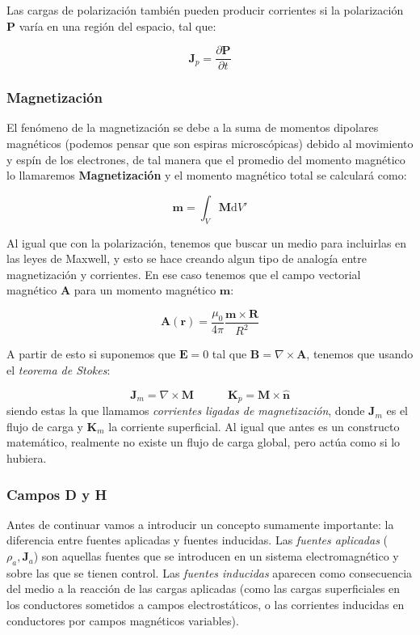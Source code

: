 \documentclass[12pt,a4paper]{article}
\newcommand{\parciales}[2]{\frac{\partial #1}{\partial #2}}
\newcommand{\D}{\mathrm{d}}
\newcommand{\tquad}{\quad \quad \quad}
\newcommand{\rota}{\nabla \times}
\newcommand{\Bn}{\mathbf{B}}
\newcommand{\En}{\mathbf{E}}
\newcommand{\Jn}{\mathbf{J}}
\newcommand{\Kn}{\mathbf{K}}
\newcommand{\rn}{\mathbf{r}}
\newcommand{\An}{\mathbf{A}}
\newcommand{\Pn}{\mathbf{P}}
\newcommand{\mn}{\mathbf{m}}
\newcommand{\Mn}{\mathbf{M}}
\newcommand{\Rn}{\mathbf{R}}
\newcommand{\hnn}{\hat{\mathbf{n}}}
\numberwithin{equation}{section}
\numberwithin{figure}{section}
\begin{document}
Las cargas de polarización también pueden producir corrientes si la polarización $\Pn$ varía en una región del espacio, tal que:

\begin{equation}
\Jn_p = \parciales{\Pn}{t}
\end{equation}


\subsubsection{Magnetización}

El fenómeno de la magnetización se debe a la suma de momentos dipolares magnéticos (podemos pensar que son espiras microscópicas) debido al movimiento y espín de los electrones, de tal manera que el promedio del momento magnético lo llamaremos \textbf{Magnetización} y el momento magnético total se calculará como:

\begin{equation}
\mn = \int_V \Mn \D V' 
\end{equation}

Al igual que con la polarización, tenemos que buscar un medio para incluirlas en las leyes de Maxwell, y esto se hace creando algun tipo de analogía entre magnetización y corrientes. En ese caso tenemos que el campo vectorial magnético $\An$ para un momento magnético $\mn$:

\begin{equation}
\An (\rn) = \dfrac{\mu_0}{4 \pi} \dfrac{\mn \times \Rn}{R^2}
\end{equation}

A partir de esto si suponemos que $\En=0$ tal que $\Bn = \rota \An$, tenemos que usando el \textit{teorema de Stokes}:

\begin{equation}
\Jn_m = \rota \Mn \tquad \Kn_p = \Mn \times \hnn
\end{equation}
siendo estas la que llamamos \textit{corrientes ligadas de magnetización}, donde $\Jn_m$ es el flujo de carga y $\Kn_m$ la corriente superficial. Al igual que antes es un constructo matemático, realmente no existe un flujo de carga global, pero actúa como si lo hubiera. 

\subsubsection{Campos D y H}

Antes de continuar vamos a introducir un concepto sumamente importante: la diferencia entre fuentes aplicadas y fuentes inducidas. Las \textit{fuentes aplicadas} ($\rho_a,\Jn_a$) son aquellas fuentes que se introducen en un sistema electromagnético y sobre las que se tienen control. Las \textit{fuentes inducidas} aparecen como consecuencia del medio a la  reacción de las cargas aplicadas (como las cargas superficiales en los conductores sometidos a campos electrostáticos, o las corrientes inducidas en conductores por campos magnéticos variables). \\
\end{document}
